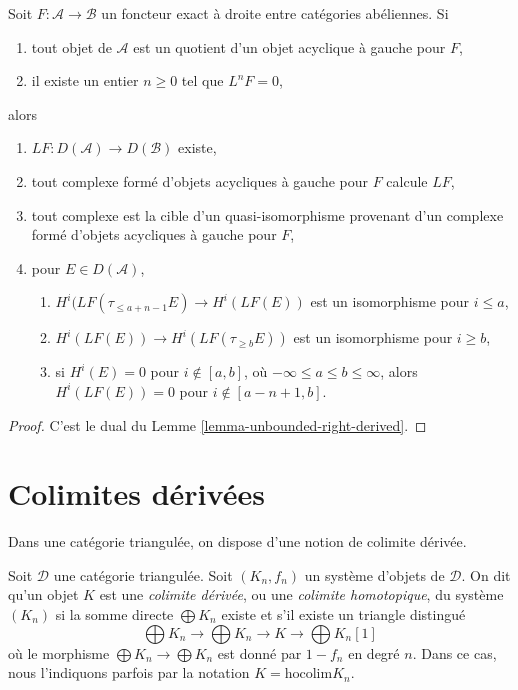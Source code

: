 \begin{lemma}
\label{lemma-unbounded-left-derived}
Soit $F : \mathcal{A} \to \mathcal{B}$ un foncteur exact à droite entre
catégories abéliennes. Si
\begin{enumerate}
\item tout objet de $\mathcal{A}$ est un quotient d'un objet acyclique à
gauche pour $F$,
\item il existe un entier $n \geq 0$ tel que $L^nF = 0$,
\end{enumerate}
alors
\begin{enumerate}
\item $LF : D(\mathcal{A}) \to D(\mathcal{B})$ existe,
\item tout complexe formé d'objets acycliques à gauche pour $F$ calcule $LF$,
\item tout complexe est la cible d'un quasi-isomorphisme provenant d'un
complexe formé d'objets acycliques à gauche pour $F$,
\item pour $E \in D(\mathcal{A})$,
\begin{enumerate}
\item $H^i(LF(\tau_{\leq a + n - 1}E) \to H^i(LF(E))$ est un isomorphisme
pour $i \leq a$,
\item $H^i(LF(E)) \to H^i(LF(\tau_{\geq b}E))$ est un isomorphisme
pour $i \geq b$,
\item si $H^i(E) = 0$ pour $i \not \in [a, b]$, où
$-\infty \leq a \leq b \leq \infty$, alors $H^i(LF(E)) = 0$
pour $i \not \in [a - n + 1, b]$.
\end{enumerate}
\end{enumerate}
\end{lemma}

\begin{proof}
C'est le dual du Lemme \ref{lemma-unbounded-right-derived}.
\end{proof}

\section{Colimites dérivées}
\label{section-derived-colimit}

\noindent
Dans une catégorie triangulée, on dispose d'une notion de colimite dérivée.

\begin{definition}
\label{definition-derived-colimit}
Soit $\mathcal{D}$ une catégorie triangulée.
Soit $(K_n, f_n)$ un système d'objets de $\mathcal{D}$.
On dit qu'un objet $K$ est une {\it colimite dérivée}, ou une
{\it colimite homotopique}, du système $(K_n)$ si la somme directe
$\bigoplus K_n$ existe et s'il existe un triangle distingué
$$
\bigoplus K_n \to \bigoplus K_n \to K \to \bigoplus K_n[1]
$$
où le morphisme $\bigoplus K_n \to \bigoplus K_n$ est donné par
$1 - f_n$ en degré $n$. Dans ce cas, nous l'indiquons parfois par la notation
$K = \text{hocolim} K_n$.
\end{definition}

